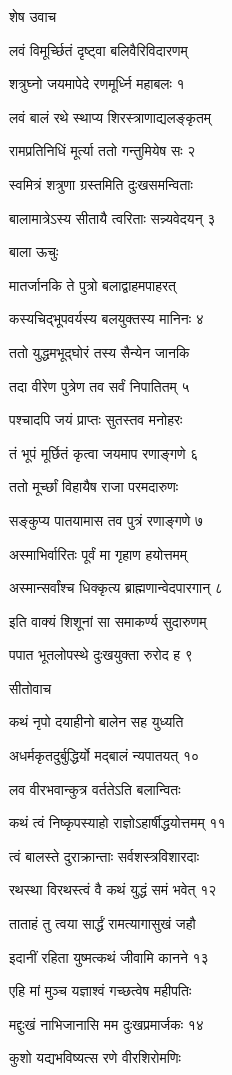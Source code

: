 
शेष उवाच

लवं विमूर्च्छितं दृष्ट्वा बलिवैरिविदारणम्

शत्रुघ्नो जयमापेदे रणमूर्ध्नि महाबलः १

लवं बालं रथे स्थाप्य शिरस्त्राणाद्यलङ्कृतम्

रामप्रतिनिधिं मूर्त्या ततो गन्तुमियेष सः २

स्वमित्रं शत्रुणा ग्रस्तमिति दुःखसमन्विताः

बालामात्रेऽस्य सीतायै त्वरिताः सन्न्यवेदयन् ३

बाला ऊचुः

मातर्जानकि ते पुत्रो बलाद्वाहमपाहरत्

कस्यचिद्भूपवर्यस्य बलयुक्तस्य मानिनः ४

ततो युद्धमभूद्घोरं तस्य सैन्येन जानकि

तदा वीरेण पुत्रेण तव सर्वं निपातितम् ५

पश्चादपि जयं प्राप्तः सुतस्तव मनोहरः

तं भूपं मूर्छितं कृत्वा जयमाप रणाङ्गणे ६

ततो मूर्च्छां विहायैष राजा परमदारुणः

सङ्कुप्य पातयामास तव पुत्रं रणाङ्गणे ७

अस्माभिर्वारितः पूर्वं मा गृहाण हयोत्तमम्

अस्मान्सर्वांश्च धिक्कृत्य ब्राह्मणान्वेदपारगान् ८

इति वाक्यं शिशूनां सा समाकर्ण्य सुदारुणम्

पपात भूतलोपस्थे दुःखयुक्ता रुरोद ह ९

सीतोवाच

कथं नृपो दयाहीनो बालेन सह युध्यति

अधर्मकृतदुर्बुद्धिर्यो मद्बालं न्यपातयत् १०

लव वीरभवान्कुत्र वर्ततेऽति बलान्वितः

कथं त्वं निष्कृपस्याहो राज्ञोऽहार्षीद्धयोत्तमम् ११

त्वं बालस्ते दुराक्रान्ताः सर्वशस्त्रविशारदाः

रथस्था विरथस्त्वं वै कथं युद्धं समं भवेत् १२

ताताहं तु त्वया सार्द्धं रामत्यागासुखं जहौ

इदानीं रहिता युष्मत्कथं जीवामि कानने १३

एहि मां मुञ्च यज्ञाश्वं गच्छत्वेष महीपतिः

मद्दुःखं नाभिजानासि मम दुःखप्रमार्जकः १४

कुशो यद्यभविष्यत्स रणे वीरशिरोमणिः


